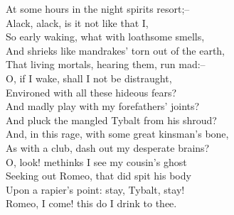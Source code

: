 \begin{speech}
At some hours in the night spirits resort;-- \\
Alack, alack, is it not like that I, \\
So early waking, what with loathsome smells, \\
And shrieks like mandrakes' torn out of the earth, \\
That   living   mortals,   hearing   them,   run mad:-- \\
O, if I wake, shall I not be distraught, \\
Environed with all these hideous fears? \\
And madly play with my forefathers' joints? \\
And pluck the mangled Tybalt from his shroud? \\
And, in this rage, with some great kinsman's bone, \\
As with a club, dash out my desperate brains? \\
O, look! methinks I see my cousin's ghost \\
Seeking out Romeo, that did spit his body \\
Upon a rapier's point: stay, Tybalt, stay! \\
Romeo, I come! this do I drink to thee. 
\\
\end{speech}


